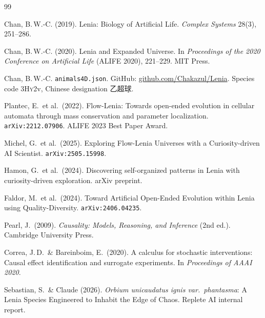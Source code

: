 \documentclass[11pt,a4paper]{article}
\begin{document}
\begin{thebibliography}{99}
\small

Chan, B.\,W.-C. (2019).
\newblock Lenia: Biology of Artificial Life.
\newblock \textit{Complex Systems} 28(3), 251--286.

Chan, B.\,W.-C. (2020).
\newblock Lenia and Expanded Universe.
\newblock In \textit{Proceedings of the 2020 Conference on Artificial Life}
  (ALIFE 2020), 221--229. MIT Press.

Chan, B.\,W.-C.
\newblock \texttt{animals4D.json}. GitHub: \url{github.com/Chakazul/Lenia}.
\newblock Species code 3\textsc{Hy}2v, Chinese designation 乙超球.

Plantec, E.\ et al.\ (2022).
\newblock Flow-Lenia: Towards open-ended evolution in cellular automata
  through mass conservation and parameter localization.
\newblock \texttt{arXiv:2212.07906}. ALIFE 2023 Best Paper Award.

Michel, G.\ et al.\ (2025).
\newblock Exploring Flow-Lenia Universes with a Curiosity-driven AI Scientist.
\newblock \texttt{arXiv:2505.15998}.

Hamon, G.\ et al.\ (2024).
\newblock Discovering self-organized patterns in Lenia with
  curiosity-driven exploration. arXiv preprint.

Faldor, M.\ et al.\ (2024).
\newblock Toward Artificial Open-Ended Evolution within Lenia using
  Quality-Diversity. \texttt{arXiv:2406.04235}.

Pearl, J.\ (2009).
\newblock \textit{Causality: Models, Reasoning, and Inference}
  (2nd ed.). Cambridge University Press.

Correa, J.\,D.\ \& Bareinboim, E.\ (2020).
\newblock A calculus for stochastic interventions: Causal effect
  identification and surrogate experiments.
\newblock In \textit{Proceedings of AAAI 2020}.

Sebastian, S.\ \& Claude (2026).
\newblock \textit{Orbium unicaudatus ignis var.\ phantasma}: A Lenia
  Species Engineered to Inhabit the Edge of Chaos. Replete AI internal
  report.


\end{thebibliography}
\end{document}
